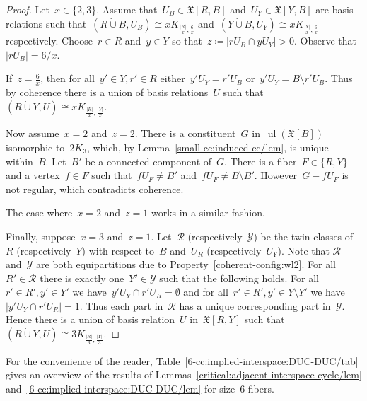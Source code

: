 \documentclass[english,a4paper]{article}
\theoremstyle{plain}
\theoremstyle{definition}
\newcommand{\abs}[1]{| #1 |}
\newcommand{\disjointUnion}{\ensuremath{\mathbin{\dot{\cup}}}}
\newcommand{\coherentConfig}{\ensuremath{\mathfrak{X}}}
\newcommand{\interspace}[2]{\ensuremath{\coherentConfig[#1,#2]}}
\newcommand{\inducedCC}[1]{\ensuremath{\coherentConfig[#1]}}
\DeclareMathOperator*{\ul}{ul}
\newcommand{\clique}[1]{\ensuremath{K_{#1}}}
\newcommand{\disjointCliques}[2]{\ensuremath{#1 \clique{#2}}}
\begin{document}
\begin{proof}
    Let~$x \in \{2,3\}$.
    Assume that~$U_B \in \interspace{R}{B}$ and~$U_Y \in \interspace{Y}{B}$ are basis relations such that~$(R \disjointUnion B,U_B) \cong \disjointCliques{x}{\frac{\abs{R}}{x},\frac{6}{x}}$ and~$(Y \disjointUnion B,U_Y) \cong \disjointCliques{x}{\frac{\abs{Y}}{x},\frac{6}{x}}$ respectively.
    Choose~$r\in R$ and~$y\in Y$ so that~$z \coloneqq \abs{rU_B \cap yU_Y}>0$.
    Observe that~$\abs{r U_B} = 6/x$.

    If~$z = \frac{6}{x}$, then for all~$y' \in Y,r' \in R$ either~$y'U_Y = r'U_B$ or~$y'U_Y = B \setminus r'U_B$.
    Thus by coherence there is a union of basis relations~$U$ such that~$(R \disjointUnion Y, U) \cong \disjointCliques{x}{\frac{\abs{R}}{x},\frac{\abs{Y}}{x}}$.

    Now assume~$x = 2$ and~$z = 2$.
    There is a constituent~$G$ in~$\ul(\inducedCC{B})$ isomorphic to~$\disjointCliques{2}{3}$, which, by Lemma~\ref{small-cc:induced-cc/lem}, is unique within~$B$.
    Let~$B'$ be a connected component of~$G$.
    There is a fiber~$F \in \{R,Y\}$ and a vertex~$f \in F$ such that~$fU_F \neq B'$ and~$fU_F \neq B \setminus B'$.
    However~$G - fU_F$ is not regular, which contradicts coherence.

    The case where~$x = 2$ and~$z=1$ works in a similar fashion.

    Finally, suppose~$x = 3$ and~$z = 1$.
    Let~$\mathcal{R}$ (respectively~$\mathcal{Y}$) be the twin classes of~$R$ (respectively~$Y$) with respect to~$B$ and~$U_R$ (respectively~$U_Y$).
    Note that $\mathcal{R}$ and~$\mathcal{Y}$ are both equipartitions due to Property~\ref{coherent-config:wl2}.
    For all~$R' \in \mathcal{R}$ there is exactly one~$Y' \in\mathcal{Y}$ such that the following holds.
    For all~$r' \in R', y' \in Y'$ we have~$y'U_Y \cap r'U_R = \emptyset$ and for all~$r' \in R', y' \in Y \setminus Y'$ we have~$\abs{y'U_Y \cap r'U_R} = 1$.
    Thus each part in~$\mathcal{R}$ has a unique corresponding part in~$\mathcal{Y}$.
    Hence there is a union of basis relation~$U$ in~$\interspace{R}{Y}$ such that~$(R \disjointUnion Y, U) \cong \disjointCliques{3}{\frac{\abs{R}}{3},\frac{\abs{Y}}{3}}$.
\end{proof}


For the convenience of the reader, Table~\ref{6-cc:implied-interspace:DUC-DUC/tab} gives an overview of the results of Lemmas~\ref{critical:adjacent-interspace-cycle/lem} and~\ref{6-cc:implied-interspace:DUC-DUC/lem} for size~$6$ fibers.
\end{document}
